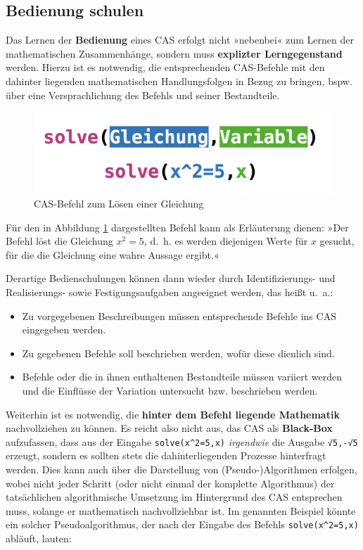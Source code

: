 \documentclass[
]{scrbook}
\providecommand{\tightlist}{%
  \setlength{\itemsep}{0pt}\setlength{\parskip}{0pt}}
\theoremstyle{definition}
\theoremstyle{definition}
\theoremstyle{definition}
\theoremstyle{definition}
\theoremstyle{remark}
\begin{document}
\subsection{Bedienung schulen}\label{bedienung-schulen}

Das Lernen der \textbf{Bedienung} eines CAS erfolgt nicht »nebenbei« zum Lernen der mathematischen Zusammenhänge, sondern muss \textbf{explizter Lerngegenstand} werden. Hierzu ist es notwendig, die entsprechenden CAS-Befehle mit den dahinter liegenden mathematischen Handlungsfolgen in Bezug zu bringen, bspw. über eine Versprachlichung des Befehls und seiner Bestandteile.

\begin{figure}

{\centering \includegraphics[width=0.5\linewidth]{pictures/10-Befehl} 

}

\caption{CAS-Befehl zum Lösen einer Gleichung}\label{fig:Befehl}
\end{figure}

Für den in Abbildung \ref{fig:Befehl} dargestellten Befehl kann als Erläuterung dienen: »Der Befehl {löst} die Gleichung {\(x^2 = 5\)}, d.~h. es werden diejenigen Werte {für \(x\)} gesucht, für die die Gleichung eine wahre Aussage ergibt.«

Derartige Bedienschulungen können dann wieder durch Identifizierungs- und Realisierungs- sowie Festigungsaufgaben angeeignet werden, das heißt u.~a.:

\begin{itemize}
\tightlist
\item
  Zu vorgegebenen Beschreibungen müssen entsprechende Befehle ins CAS eingegeben werden.
\item
  Zu gegebenen Befehle soll beschrieben werden, wofür diese dienlich sind.
\item
  Befehle oder die in ihnen enthaltenen Bestandteile müssen variiert werden und die Einflüsse der Variation untersucht bzw. beschrieben werden.
\end{itemize}

Weiterhin ist es notwendig, die \textbf{hinter dem Befehl liegende Mathematik} nachvollziehen zu können. Es reicht also nicht aus, das CAS als \textbf{Black-Box} aufzufassen, dass aus der Eingabe \texttt{solve(x\^{}2=5,x)} \emph{irgendwie} die Ausgabe \texttt{√5,-√5} erzeugt, sondern es sollten stets die dahinterliegenden Prozesse hinterfragt werden. Dies kann auch über die Darstellung von (Pseudo-)Algorithmen erfolgen, wobei nicht jeder Schritt (oder nicht einmal der komplette Algorithmus) der tatsächlichen algorithmische Umsetzung im Hintergrund des CAS entsprechen muss, solange er mathematisch nachvollziehbar ist. Im genannten Beispiel könnte ein solcher Pseudoalgorithmus, der nach der Eingabe des Befehls \texttt{solve(x\^{}2=5,x)} abläuft, lauten:
\end{document}
